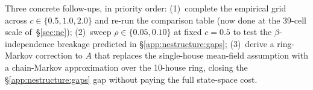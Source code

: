 \documentclass{anvil-paper}
\begin{document}
Three concrete follow-ups, in priority order:
(1)~complete the empirical grid across $c\in\{0.5,1.0,2.0\}$ and
re-run the comparison table (now done at the 39-cell scale
of~\S\ref{sec:ne}); (2)~sweep $\rho\in\{0.05,0.10\}$ at fixed $c{=}0.5$
to test the $\beta$-independence breakage predicted in
\S\ref{app:nestructure:gaps}; (3)~derive a ring-Markov correction to
$A$ that replaces the single-house mean-field assumption with a
chain-Markov approximation over the 10-house ring, closing the
\S\ref{app:nestructure:gaps} gap without paying the full state-space
cost.
\end{document}
